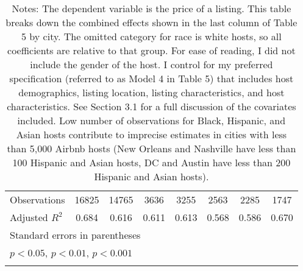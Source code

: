{\begin{longtable}{l*{7}{c}}
Observations        &       16825         &       14765         &        3636         &        3255         &        2563         &        2285         &        1747         \\
Adjusted \(R^{2}\)  &       0.684         &       0.616         &       0.611         &       0.613         &       0.568         &       0.586         &       0.670         \\
\hline\hline
\multicolumn{8}{l}{\footnotesize Standard errors in parentheses}\\
\multicolumn{8}{l}{\footnotesize \sym{*} \(p<0.05\), \sym{**} \(p<0.01\), \sym{***} \(p<0.001\)}\\
\caption*{Notes: The dependent variable is the price of a listing. This table breaks down the combined effects shown in the last column of Table 5 by city. The omitted category for race is white hosts, so all coefficients are relative to that group. For ease of reading, I did not include the gender of the host. I control for my preferred specification (referred to as Model 4 in Table 5) that includes host demographics, listing location, listing characteristics, and host characteristics. See Section 3.1 for a full discussion of the covariates included. Low number of observations for Black, Hispanic, and Asian hosts contribute to imprecise estimates in cities with less than 5,000 Airbnb hosts (New Orleans and Nashville have less than 100 Hispanic and Asian hosts, DC and Austin have less than 200 Hispanic and Asian hosts).}
\end{longtable}
}


